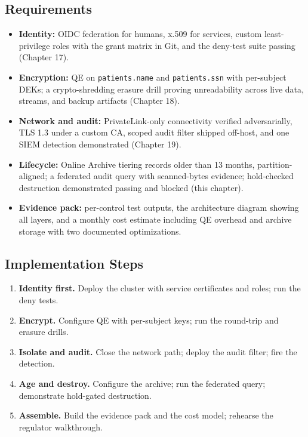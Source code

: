\subsection*{Requirements}
\begin{itemize}
    \item \textbf{Identity:} OIDC federation for humans, x.509 for services, custom least-privilege roles with the grant matrix in Git, and the deny-test suite passing (Chapter 17).
    \item \textbf{Encryption:} QE on \texttt{patients.name} and \texttt{patients.ssn} with per-subject DEKs; a crypto-shredding erasure drill proving unreadability across live data, streams, and backup artifacts (Chapter 18).
    \item \textbf{Network and audit:} PrivateLink-only connectivity verified adversarially, TLS 1.3 under a custom CA, scoped audit filter shipped off-host, and one SIEM detection demonstrated (Chapter 19).
    \item \textbf{Lifecycle:} Online Archive tiering records older than 13 months, partition-aligned; a federated audit query with scanned-bytes evidence; hold-checked destruction demonstrated passing and blocked (this chapter).
    \item \textbf{Evidence pack:} per-control test outputs, the architecture diagram showing all layers, and a monthly cost estimate including QE overhead and archive storage with two documented optimizations.
\end{itemize}

\subsection*{Implementation Steps}
\begin{enumerate}
    \item \textbf{Identity first.} Deploy the cluster with service certificates and roles; run the deny tests.
    \item \textbf{Encrypt.} Configure QE with per-subject keys; run the round-trip and erasure drills.
    \item \textbf{Isolate and audit.} Close the network path; deploy the audit filter; fire the detection.
    \item \textbf{Age and destroy.} Configure the archive; run the federated query; demonstrate hold-gated destruction.
    \item \textbf{Assemble.} Build the evidence pack and the cost model; rehearse the regulator walkthrough.
\end{enumerate}

